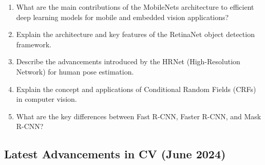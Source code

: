 \documentclass[12pt]{article}
\begin{document}
\begin{enumerate}
    \item What are the main contributions of the MobileNets architecture to efficient deep learning models for mobile and embedded vision applications?
    \item Explain the architecture and key features of the RetinaNet object detection framework.
    \item Describe the advancements introduced by the HRNet (High-Resolution Network) for human pose estimation.
    \item Explain the concept and applications of Conditional Random Fields (CRFs) in computer vision.
    \item What are the key differences between Fast R-CNN, Faster R-CNN, and Mask R-CNN?
\end{enumerate}

\subsection{Latest Advancements in CV (June 2024)}
\end{document}
